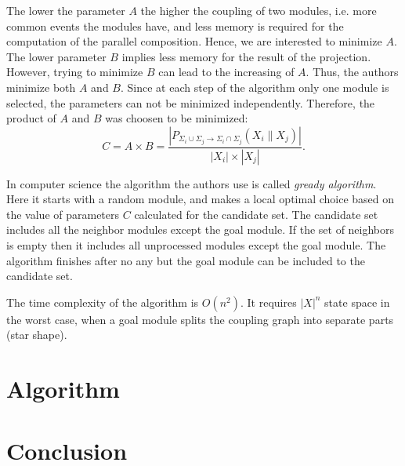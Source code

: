 \documentclass[a4paper, 10pt, conference]{ieeeconf}
\begin{document}
The lower the parameter $A$ the higher the coupling of two modules, i.e. more
common events the modules have, and less memory is required for the computation
of the parallel composition. Hence, we are interested to minimize $A$. The lower
parameter $B$ implies less memory for the result of the projection. However,
trying to minimize $B$ can lead to the increasing of $A$. Thus, the authors
minimize both $A$ and $B$. Since at each step of the algorithm only one module is
selected, the parameters can not be minimized independently. Therefore, the
product of $A$ and $B$ was choosen to be minimized:
\begin{equation}
	C = A \times B = 
		\frac{| P_{\Sigma_i \cup \Sigma_j \rightarrow \Sigma_i \cap \Sigma_j}
		(X_i \parallel X_j) |}
		{|X_i|\times |X_j|}.
\end{equation}

In computer science the algorithm the authors use is called \emph{gready
algorithm}. Here it starts with a random module, and makes a local optimal
choice based on the value of parameters $C$ calculated for the candidate set.
The candidate set includes all the neighbor modules except the goal module. If
the set of neighbors is empty then it includes all unprocessed modules except
the goal module. The algorithm finishes after no any but the goal module can be
included to the candidate set.

The time complexity of the algorithm is $O(n^2)$. It requires $|X|^n$ state
space in the worst case, when a goal module splits the coupling graph into
separate parts (star shape). 


\section{Algorithm}
\label{sec:Algorithm}


\section{Conclusion}
\label{sec:Conclusion}




\end{document}
